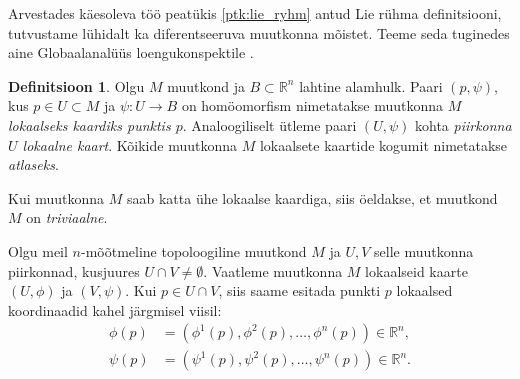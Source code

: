 \documentclass[12pt,a4paper,oneside]{article}
\theoremstyle{plain}
\theoremstyle{definition}
\newtheorem{definitsioon}{Definitsioon}[section]
\numberwithin{equation}{section}
\def\R{{\mathbb R}}
\begin{document}
Arvestades käesoleva töö peatükis \ref{ptk:lie_ryhm} antud Lie 
rühma definitsiooni, tutvustame lühidalt ka diferentseeruva muutkonna 
mõistet. Teeme seda tuginedes aine Globaalanalüüs loengukonspektile 
\cite{globanal}.

\begin{definitsioon}
Olgu $M$ muutkond ja $B \subset \R^n$ lahtine alamhulk. Paari 
$\left(p, \psi\right)$, kus $p \in U \subset M$ ja 
$\psi : U \rightarrow B$ on homöomorfism nimetatakse muutkonna 
$M$ \emph{lokaalseks kaardiks punktis $p$}. Analoogiliselt ütleme 
paari $\left(U, \psi\right)$ kohta \emph{piirkonna $U$ lokaalne 
kaart}. Kõikide muutkonna $M$ lokaalsete kaartide kogumit nimetatakse 
\emph{atlaseks}.

Kui muutkonna $M$ saab katta ühe lokaalse kaardiga, siis öeldakse, 
et muutkond $M$ on \emph{triviaalne}.
\end{definitsioon}

Olgu meil $n$-mõõtmeline topoloogiline muutkond $M$ ja $U,V$ selle 
muutkonna piirkonnad, kusjuures $U \cap V \neq \emptyset$. Vaatleme 
muutkonna $M$ lokaalseid kaarte $\left(U, \phi\right)$ ja 
$\left(V, \psi\right)$. Kui $p \in U \cap V$, siis saame esitada 
punkti $p$ lokaalsed koordinaadid kahel järgmisel viisil:
\begin{align*}
\phi\left(p\right) &= \left(\phi^1\left(p\right), 
\phi^2\left(p\right), \ldots, \phi^n\left(p\right)\right) \in \R^n, \\
\psi\left(p\right) &= \left(\psi^1\left(p\right), 
\psi^2\left(p\right), \ldots, \psi^n\left(p\right)\right) \in \R^n.
\end{align*}
\end{document}
